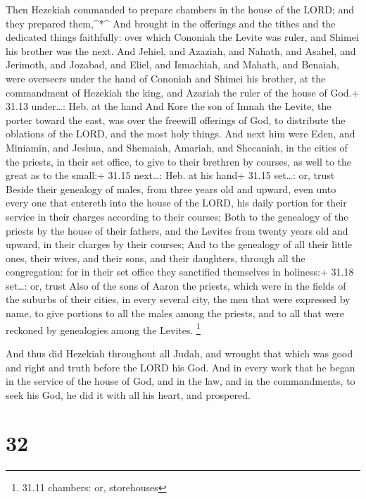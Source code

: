  Then Hezekiah commanded to prepare chambers in the house
of the LORD; and they prepared them,\^{}*\^{}  And brought
in the offerings and the tithes and the dedicated things faithfully:
over which Cononiah the Levite was ruler, and Shimei his brother was the
next.  And Jehiel, and Azaziah, and Nahath, and Asahel, and
Jerimoth, and Jozabad, and Eliel, and Ismachiah, and Mahath, and
Benaiah, were overseers under the hand of Cononiah and Shimei his
brother, at the commandment of Hezekiah the king, and Azariah the ruler
of the house of God.+ 31.13 under\ldots: Heb. at the hand 
And Kore the son of Imnah the Levite, the porter toward the east, was
over the freewill offerings of God, to distribute the oblations of the
LORD, and the most holy things.  And next him were Eden,
and Miniamin, and Jeshua, and Shemaiah, Amariah, and Shecaniah, in the
cities of the priests, in their set office, to give to their brethren by
courses, as well to the great as to the small:+ 31.15 next\ldots: Heb.
at his hand+ 31.15 set\ldots: or, trust  Beside their
genealogy of males, from three years old and upward, even unto every one
that entereth into the house of the LORD, his daily portion for their
service in their charges according to their courses;  Both
to the genealogy of the priests by the house of their fathers, and the
Levites from twenty years old and upward, in their charges by their
courses;  And to the genealogy of all their little ones,
their wives, and their sons, and their daughters, through all the
congregation: for in their set office they sanctified themselves in
holiness:+ 31.18 set\ldots: or, trust  Also of the sons of
Aaron the priests, which were in the fields of the suburbs of their
cities, in every several city, the men that were expressed by name, to
give portions to all the males among the priests, and to all that were
reckoned by genealogies among the Levites. \footnote{31.11 chambers: or,
  storehouses}

 And thus did Hezekiah throughout all Judah, and wrought
that which was good and right and truth before the LORD his God.
 And in every work that he began in the service of the
house of God, and in the law, and in the commandments, to seek his God,
he did it with all his heart, and prospered.

\hypertarget{section-31}{%
\section{32}\label{section-31}}

